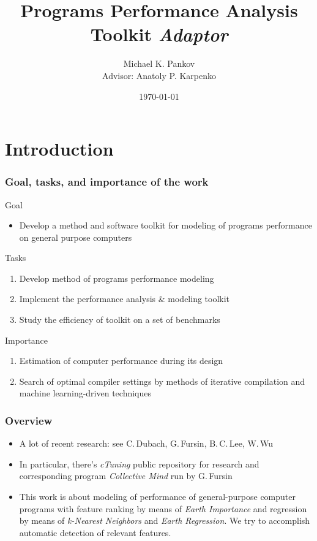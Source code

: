 \documentclass{beamer}
\title{Programs Performance Analysis Toolkit \textit{Adaptor}}
\author{Michael K. Pankov\\Advisor: Anatoly P. Karpenko}
\institute{Bauman Moscow State Technical University}
\date{\today}
\begin{document}
\maketitle

\section{Introduction}

\begin{frame}
\frametitle{Goal, tasks, and importance of the work}

\begin{block}{Goal}
	\begin{itemize}
		\item Develop a method and software toolkit for modeling of programs performance on general purpose computers
	\end{itemize}
\end{block}

\begin{block}{Tasks}
	\begin{enumerate}
		\item Develop method of programs performance modeling 
		\item Implement the performance analysis \& modeling toolkit
		\item Study the efficiency of toolkit on a set of benchmarks
	\end{enumerate}
\end{block}

\begin{block}{Importance}
	\begin{enumerate}
		\item Estimation of computer performance during its design
		\item Search of optimal compiler settings by methods of iterative compilation and machine learning-driven techniques
	\end{enumerate}
\end{block}

\end{frame}

\begin{frame}
\frametitle{Overview}
	
	\begin{itemize}
		\item A lot of recent research: see C.\,Dubach, G.\,Fursin, B.\,C.\,Lee, W.\,Wu
		\item In particular, there's \textit{cTuning} public repository for research and corresponding program \textit{Collective Mind} run by G.\,Fursin
		\item This work is about modeling of performance of general-purpose computer programs with feature ranking by means of \textit{Earth Importance} and regression by means of \textit{k-Nearest Neighbors} and \textit{Earth Regression}. We try to accomplish automatic detection of relevant features.
	\end{itemize}
\end{frame}
\end{document}
